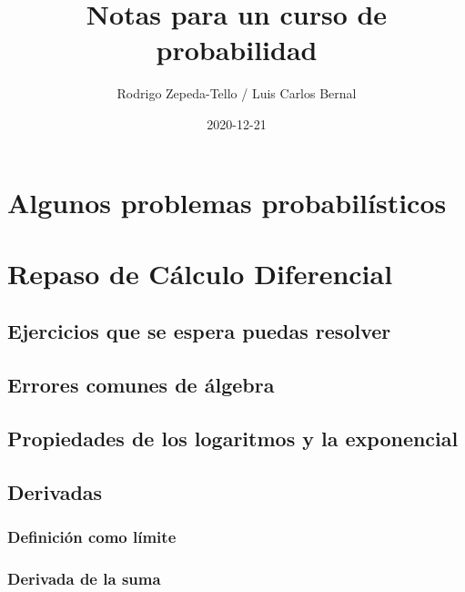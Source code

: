 \documentclass[
]{book}
\title{Notas para un curso de probabilidad}
\author{Rodrigo Zepeda-Tello / Luis Carlos Bernal}
\date{2020-12-21}
\begin{document}
\maketitle

{
\setcounter{tocdepth}{1}
\tableofcontents
}
\hypertarget{algunos-problemas-probabiluxedsticos}{%
\chapter{Algunos problemas probabilísticos}\label{algunos-problemas-probabiluxedsticos}}

\hypertarget{repaso_diferencial}{%
\chapter{Repaso de Cálculo Diferencial}\label{repaso_diferencial}}

\hypertarget{ejercicios-que-se-espera-puedas-resolver}{%
\section{Ejercicios que se espera puedas resolver}\label{ejercicios-que-se-espera-puedas-resolver}}

\hypertarget{errores-comunes-de-uxe1lgebra}{%
\section{Errores comunes de álgebra}\label{errores-comunes-de-uxe1lgebra}}

\hypertarget{propiedades-de-los-logaritmos-y-la-exponencial}{%
\section{Propiedades de los logaritmos y la exponencial}\label{propiedades-de-los-logaritmos-y-la-exponencial}}

\hypertarget{derivadas}{%
\section{Derivadas}\label{derivadas}}

\hypertarget{definiciuxf3n-como-luxedmite}{%
\subsection{Definición como límite}\label{definiciuxf3n-como-luxedmite}}

\hypertarget{derivada-de-la-suma}{%
\subsection{Derivada de la suma}\label{derivada-de-la-suma}}
\end{document}
